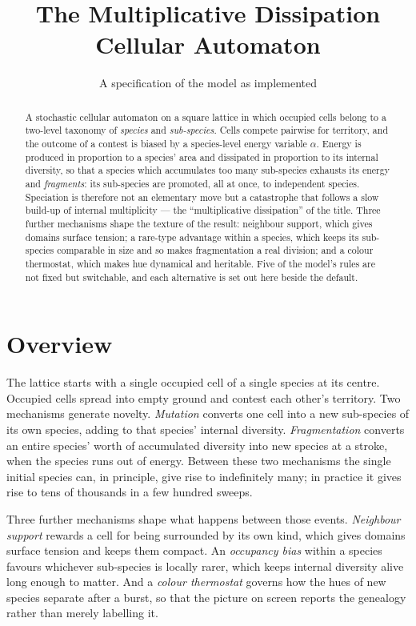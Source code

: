 \documentclass[11pt,a4paper]{article}
\title{The Multiplicative Dissipation Cellular Automaton}
\author{A specification of the model as implemented}
\date{}
\begin{document}
\maketitle

\begin{abstract}
\noindent
A stochastic cellular automaton on a square lattice in which occupied cells belong to
a two-level taxonomy of \emph{species} and \emph{sub-species}. Cells compete pairwise for
territory, and the outcome of a contest is biased by a species-level energy variable
$\alpha$. Energy is produced in proportion to a species' area and dissipated in proportion
to its internal diversity, so that a species which accumulates too many sub-species
exhausts its energy and \emph{fragments}: its sub-species are promoted, all at once, to
independent species. Speciation is therefore not an elementary move but a catastrophe
that follows a slow build-up of internal multiplicity --- the ``multiplicative
dissipation'' of the title. Three further mechanisms shape the texture of the result:
neighbour support, which gives domains surface tension; a rare-type advantage within a
species, which keeps its sub-species comparable in size and so makes fragmentation a real
division; and a colour thermostat, which makes hue dynamical and heritable. Five of the model's rules are not fixed but switchable, and each
alternative is set out here beside the default.
\end{abstract}

\section{Overview}

The lattice starts with a single occupied cell of a single species at its centre.
Occupied cells spread into empty ground and contest each other's territory. Two
mechanisms generate novelty. \emph{Mutation} converts one cell into a new sub-species of
its own species, adding to that species' internal diversity. \emph{Fragmentation}
converts an entire species' worth of accumulated diversity into new species at a
stroke, when the species runs out of energy. Between these two mechanisms the single
initial species can, in principle, give rise to indefinitely many; in practice it gives
rise to tens of thousands in a few hundred sweeps.

Three further mechanisms shape what happens between those events. \emph{Neighbour
support} rewards a cell for being surrounded by its own kind, which gives domains
surface tension and keeps them compact. An \emph{occupancy bias} within a species
favours whichever sub-species is locally rarer, which keeps internal diversity alive
long enough to matter. And a \emph{colour thermostat} governs how the hues of new
species separate after a burst, so that the picture on screen reports the genealogy
rather than merely labelling it.
\end{document}
